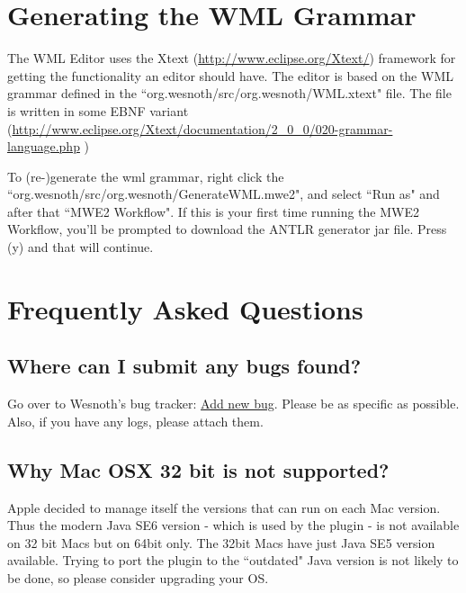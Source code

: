 \documentclass[10pt]{article}
\begin{document}
\section{Generating the WML Grammar}
The WML Editor uses the Xtext (\href{http://www.eclipse.org/Xtext/}{http://www.eclipse.org/Xtext/}) framework for getting the functionality an editor should have. The editor is based on the WML grammar defined in the ``org.wesnoth/src/org.wesnoth/WML.xtext" file.
The file is written in some EBNF variant (\href{http://www.eclipse.org/Xtext/documentation/2\_0\_0/020-grammar-language.php}{http://www.eclipse.org/Xtext/documentation/2\_0\_0/020-grammar-language.php} )

To (re-)generate the wml grammar, right click the ``org.wesnoth/src/org.wesnoth/GenerateWML.mwe2", and select ``Run as" and after that ``MWE2 Workflow". If this is your first time running the MWE2 Workflow, you'll be prompted to download the ANTLR generator jar file. Press (y) and that will continue.

\section{Frequently Asked Questions}
\subsection{Where can I submit any bugs found?}
Go over to Wesnoth's bug tracker: \href{https://gna.org/bugs/?func=additem&group=wesnoth&bug_group_id=116}{Add new bug}. Please be as specific as possible. Also, if you have any logs, please attach them.

\subsection{Why Mac OSX 32 bit is not supported?}
Apple decided to manage itself the versions that can run on each Mac version. Thus the modern Java SE6 version - which is used by the plugin - is not available on 32 bit Macs but on 64bit only. The 32bit Macs have just Java SE5 version available. Trying to port the plugin to the ``outdated" Java version is not likely to be done, so please consider upgrading your OS.
\end{document}

